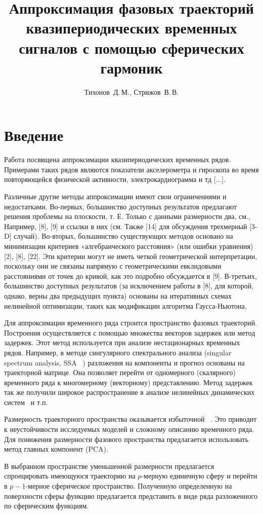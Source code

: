 \documentclass[12pt,twoside]{article}
\title
    [Аппроксимация фазовой траектории] 
    {Аппроксимация фазовых траекторий квазипериодических временных сигналов с помощью сферических гармоник}
\author
    {Тихонов~Д.\,М., Стрижов~В.\,В.} %
\begin{document}
\maketitle

\section{Введение}
Работа посвящена аппроксимации квазипериодических временных рядов.
Примерами таких рядов являются показатели акселерометра и гироскопа во время повторяющейся физической активности, электрокардиограмма и тд [...].

Различные другие методы аппроксимации имеют свои ограничениями и недостатками.
Во-первых, большинство доступных результатов предлагают решения проблемы на плоскости, т. Е. Только с данными размерности два, см., Например, [8], [9] и ссылки в них (см. Также [14] для обсуждения трехмерный [3-D] случай). Во-вторых, большинство существующих методов основано на минимизации критериев «алгебраического расстояния» (или ошибки уравнения) [2], [8], [22]. Эти критерии могут не иметь четкой геометрической интерпретации, поскольку они не связаны напрямую с геометрическими евклидовыми расстояниями от точек до кривой, как это подробно обсуждается в [9]. В-третьих, большинство доступных результатов (за исключением работы в [8], для которой, однако, верны два предыдущих пункта) основаны на итеративных схемах нелинейной оптимизации, таких как модификации алгоритма Гаусса-Ньютона,
	
Для аппроксимации временного ряда строится пространство фазовых траекторий.
Построения осуществляется с помощью множества векторов задержек или метод задержек.
Этот метод используется при анализе нестационарных временных рядов.
Например, в методе сингулярного спектрального анализа (singular spectrum analysis, SSA ~\cite{Golyandina2002}) разложения на компоненты и прогноз основаны на траекторной матрице.
Она позволяет перейти от одномерного (скалярного) временного ряда к многомерному (векторному) представлению.
Метод задержек так же получили широкое распространение в анализе нелинейных динамических систем~\cite{Takens1981} и т.п.

Размерность траекторного пространства оказывается избыточной ~\cite{Golyandina2002}.
Это приводит к неустойчивости исследуемых моделей и сложному описанию временного ряда.
Для понижения размерности фазового пространства предлагается использовать  метод главных компонент (PCA).
	
В выбранном пространстве уменьшенной размерности предлагается спроецировать имеющуюся траекторию на $p$-мерную единичную сферу и перейти в $p-1$-мерное сферическое пространство.
Полученную определенную на поверхности сферы функцию предлагается представить в виде ряда разложенного по сферическим функциям.
\end{document}
